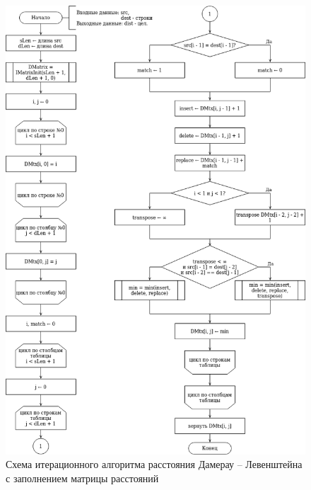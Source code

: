 \begin{figure}[h!]
	\begin{center}
		\includegraphics[scale=0.6]{./assets/d-leven-iter.png}
	\end{center}
	
	\caption{Схема итерационного алгоритма расстояния Дамерау -- Левенштейна с заполнением матрицы расстояний}
	\label{fig:d-iter-matrix}
\end{figure}

